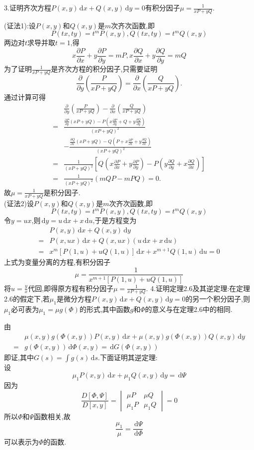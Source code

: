 \documentclass[titlepage,11pt,a4paper,twoside]{report}
\makeatletter
\newcommand\diff{\,\mathrm{d}}
\renewenvironment{proof}{\par
	\pushQED{\qed}%
	\normalfont \topsep1\p@\@plus6\p@\relax
	\trivlist
	\item\relax
	{\hspace*{\parindent}{\heiti 证明}\@addpunct{:}}\hspace\labelsep\ignorespaces
}{%
	\popQED\endtrivlist\@endpefalse
}
\makeatother
\begin{document}
3.证明齐次方程$P(x,y)\diff x+Q(x,y)\diff y=0$有积分因子$\mu=\frac{1}{xP+yQ}$.
\begin{proof}
(证法1):设$P(x,y)$和$Q(x,y)$是$m$次齐次函数,即
\[P(tx,ty)=t^mP(x,y),Q(tx,ty)=t^mQ(x,y)\]
两边对$t$求导并取$t=1$,得
\[x\frac{\partial P}{\partial x}+y\frac{\partial P}{\partial y}=mP,x\frac{\partial Q}{\partial x}+y\frac{\partial Q}{\partial y}=mQ\]
为了证明$\frac{1}{xP+yQ}$是齐次方程的积分因子,只需要证明
\[\frac{\partial}{\partial y}\left(\frac{P}{xP+yQ}\right)=\frac{\partial}{\partial x}\left(\frac{Q}{xP+yQ}\right).\]
通过计算可得
\[\begin{split}
&\frac{\partial}{\partial y}\left(\frac{P}{xP+yQ}\right)-\frac{\partial}{\partial x}\left(\frac{Q}{xP+yQ}\right)\\
=&\frac{\frac{\partial P}{\partial y}(xP+yQ)-P\left(x\frac{\partial P}{\partial y}+Q+y\frac{\partial Q}{\partial y}\right)}{(xP+yQ)^2}\\
&-\frac{\frac{\partial Q}{\partial x}(xP+yQ)-Q\left(P+x\frac{\partial P}{\partial x}+y\frac{\partial Q}{\partial x}\right)}{(xP+yQ)^2}\\
=&\frac{1}{(xP+yQ)^2}\left[Q\left(x\frac{\partial P}{\partial x}+y\frac{\partial P}{\partial y}\right)-P\left(y\frac{\partial Q}{\partial y}+x\frac{\partial Q}{\partial x}\right)\right]\\
=&\frac{1}{(xP+yQ)^2}(mQP-mPQ)=0.
\end{split}\]
故$\mu=\frac{1}{xP+yQ}$是积分因子.\\
(证法2)设$P(x,y)$和$Q(x,y)$是$m$次齐次函数,即
\[P(tx,ty)=t^mP(x,y),Q(tx,ty)=t^mQ(x,y)\]
令$y=ux$,则$\diff y=u\diff x+x\diff u$,于是方程变为
\[\begin{split}
&P(x,y)\diff x+Q(x,y)\diff y\\
=&P(x,ux)\diff x+Q(x,ux)(u\diff x+x\diff u)\\
=&x^m\left[P(1,u)+uQ(1,u)\right]\diff x+x^{m+1}Q(1,u)\diff u=0
\end{split}\]
上式为变量分离的方程,有积分因子
\[\mu=\frac{1}{x^{m+1}[P(1,u)+uQ(1,u)]}\]
将$u=\frac{y}{x}$代回,即得原方程有积分因子$\mu=\frac{1}{xP+yQ}$.
\end{proof}
4.证明定理2.6及其逆定理:在定理2.6的假定下,若$\mu_1$是微分方程$P(x,y)\diff x+Q(x,y)\diff y=0$的另一个积分因子,则$\mu_1$必可表为$\mu_1=\mu g(\varPhi)$的形式,其中函数$g$和$\varPhi$的意义与在定理2.6中的相同.
\begin{proof}由
\[\begin{split}
&\mu(x,y)g(\varPhi(x,y))P(x,y)\diff x+\mu(x,y)g(\varPhi(x,y))Q(x,y)\diff y\\
=&g(\varPhi(x,y))\diff\varPhi(x,y)=\diff G(\varPhi(x,y))
\end{split}\]
即证,其中$G(s)=\int g(s)\diff s$.下面证明其逆定理:\\设
\[\mu_1P(x,y)\diff x+\mu_1Q(x,y)\diff y=\diff\varPsi\]
因为
\[\frac{D[\varPhi,\varPsi]}{D[x,y]}=
\begin{vmatrix}\mu P&\mu Q\\\mu_1P&\mu_1Q\end{vmatrix}=0\]
所以$\varPhi$和$\varPsi$函数相关,故 
\[\frac{\mu_1}{\mu}=\frac{\diff\varPsi}{\diff\varPhi}\]
可以表示为$\varPhi$的函数.
\end{proof}
\end{document}
